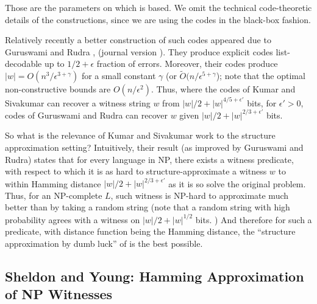 Those are the parameters on which \cite{FLN00} is based. We omit the
technical code-theoretic details of the constructions, since we are
using the codes in the black-box fashion.  

Relatively recently a better construction of such codes appeared due
to Guruswami and Rudra \cite{GR08}, (journal version
\cite{GR-journal}). They produce explicit codes list-decodable up to 
$1/2+\epsilon$ fraction of errors.  Moreover, their codes produce
$|w|=O(n^3/\epsilon^{3+\gamma})$ for a small constant $\gamma$ (or
$\tilde{O}(n/\epsilon^{5+\gamma}$); note that the optimal
non-constructive bounds are $O(n/\epsilon^2)$. Thus, where the codes
of Kumar and Sivakumar can recover a witness string $w$  from
$|w|/2+|w|^{4/5+\epsilon'}$ bits, for $\epsilon'>0$, codes of
Guruswami and Rudra can recover $w$ given 
$|w|/2+|w|^{2/3+\epsilon'}$ bits.  


So what is the relevance of Kumar and Sivakumar work to the structure
approximation setting? Intuitively, their result (as improved by
Guruswami and Rudra) states that for every language in NP, there
exists a witness predicate, with respect to which it is as hard to
structure-approximate a witness $w$ to within Hamming distance
$|w|/2+|w|^{2/3+\epsilon'}$ as it is so solve the original
problem. Thus, for an NP-complete $L$, such witness is NP-hard to
approximate much better than by taking a random string (note that a
random string with high probability agrees with a witness on
$|w|/2+|w|^{1/2}$ bits. ) And therefore for such a predicate, with
distance function being the Hamming distance, the ``structure
approximation by dumb luck'' of \cite{HMRW07} is the best possible.



\subsection{Sheldon and Young: Hamming Approximation of NP Witnesses}

